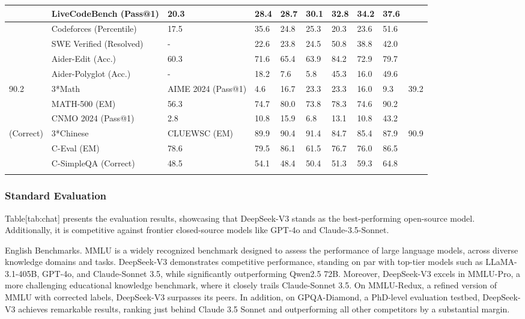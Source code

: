 \documentclass[11pt,a4paper]{article}
\begin{document}
\begin{table}[h]
\begin{tabular}{|l|l|l|l|l|l|l|l|l|l|}
 & LiveCodeBench (Pass@1) & 20.3 & 28.4 & 28.7 & 30.1 & 32.8 & 34.2 & 37.6 &  \\ \hline
 & Codeforces (Percentile) & 17.5 & 35.6 & 24.8 & 25.3 & 20.3 & 23.6 & 51.6 &  \\ \hline
 & SWE Verified (Resolved) & - & 22.6 & 23.8 & 24.5 & 50.8 & 38.8 & 42.0 &  \\ \hline
 & Aider-Edit (Acc.) & 60.3 & 71.6 & 65.4 & 63.9 & 84.2 & 72.9 & 79.7 &  \\ \hline
 & Aider-Polyglot (Acc.) & - & 18.2 & 7.6 & 5.8 & 45.3 & 16.0 & 49.6 &  \\ \hline
90.2 & 3*Math & AIME 2024 (Pass@1) & 4.6 & 16.7 & 23.3 & 23.3 & 16.0 & 9.3 & 39.2 \\ \hline
 & MATH-500 (EM) & 56.3 & 74.7 & 80.0 & 73.8 & 78.3 & 74.6 & 90.2 &  \\ \hline
 & CNMO 2024 (Pass@1) & 2.8 & 10.8 & 15.9 & 6.8 & 13.1 & 10.8 & 43.2 &  \\ \hline
(Correct) & 3*Chinese & CLUEWSC (EM) & 89.9 & 90.4 & 91.4 & 84.7 & 85.4 & 87.9 & 90.9 \\ \hline
 & C-Eval (EM) & 78.6 & 79.5 & 86.1 & 61.5 & 76.7 & 76.0 & 86.5 &  \\ \hline
 & C-SimpleQA (Correct) & 48.5 & 54.1 & 48.4 & 50.4 & 51.3 & 59.3 & 64.8 &  \\ \hline
 &  &  &  &  &  &  &  &  &  \\ \hline
\end{tabular}
\end{table}

\subsubsection{Standard Evaluation}

Table[tab:chat] presents the evaluation results, showcasing that DeepSeek-V3 stands as the best-performing open-source model. Additionally, it is competitive against frontier closed-source models like GPT-4o and Claude-3.5-Sonnet.

English Benchmarks. MMLU is a widely recognized benchmark designed to assess the performance of large language models, across diverse knowledge domains and tasks. DeepSeek-V3 demonstrates competitive performance, standing on par with top-tier models such as LLaMA-3.1-405B, GPT-4o, and Claude-Sonnet 3.5, while significantly outperforming Qwen2.5 72B. Moreover, DeepSeek-V3 excels in MMLU-Pro, a more challenging educational knowledge benchmark, where it closely trails Claude-Sonnet 3.5. On MMLU-Redux, a refined version of MMLU with corrected labels, DeepSeek-V3 surpasses its peers. In addition, on GPQA-Diamond, a PhD-level evaluation testbed, DeepSeek-V3 achieves remarkable results, ranking just behind Claude 3.5 Sonnet and outperforming all other competitors by a substantial margin.
\end{document}
